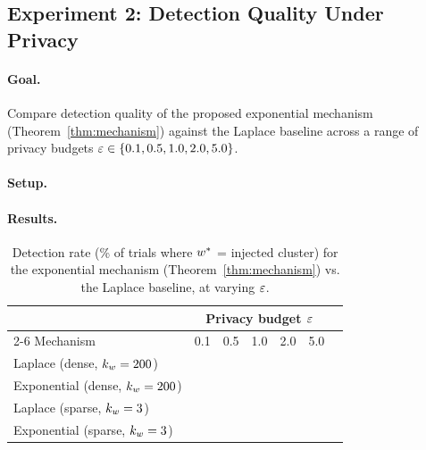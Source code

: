 
\subsection{Experiment 2: Detection Quality Under Privacy}
\label{sec:exp2}

\paragraph{Goal.}
Compare detection quality of the proposed exponential mechanism (Theorem~\ref{thm:mechanism})
against the Laplace baseline across a range of privacy budgets $\varepsilon \in \{0.1, 0.5, 1.0, 2.0, 5.0\}$.

\paragraph{Setup.}

\paragraph{Results.}

\begin{table}[ht]
    \centering
    \caption{Detection rate (\% of trials where $w^*$ = injected cluster) for the
             exponential mechanism (Theorem~\ref{thm:mechanism}) vs. the Laplace
             baseline, at varying $\varepsilon$.}
    \label{tab:detection}
    \begin{tabular}{@{}lcccccc@{}}
        \toprule
        & \multicolumn{5}{c}{Privacy budget $\varepsilon$} \\
        \cmidrule(l){2-6}
        Mechanism & 0.1 & 0.5 & 1.0 & 2.0 & 5.0 \\
        \midrule
        Laplace (dense, $k_w=200$)      & \placeholder{?} & \placeholder{?} & \placeholder{?} & \placeholder{?} & \placeholder{?} \\
        Exponential (dense, $k_w=200$)  & \placeholder{?} & \placeholder{?} & \placeholder{?} & \placeholder{?} & \placeholder{?} \\
        \midrule
        Laplace (sparse, $k_w=3$)       & \placeholder{?} & \placeholder{?} & \placeholder{?} & \placeholder{?} & \placeholder{?} \\
        Exponential (sparse, $k_w=3$)   & \placeholder{?} & \placeholder{?} & \placeholder{?} & \placeholder{?} & \placeholder{?} \\
        \bottomrule
    \end{tabular}
\end{table}

